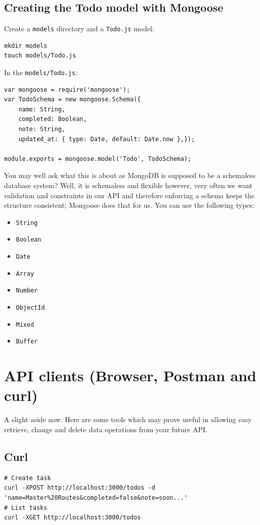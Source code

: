 \documentclass[12pt]{article}
\begin{document}
\subsection{Creating the Todo model with Mongoose}

Create a \texttt{models} directory and a \texttt{Todo.js} model:
\begin{Verbatim}
mkdir models
touch models/Todo.js
\end{Verbatim}
In the \texttt{models/Todo.js}:
\begin{Verbatim}
var mongoose = require('mongoose');
var TodoSchema = new mongoose.Schema({  
	name: String,  
	completed: Boolean,  
	note: String,  
	updated_at: { type: Date, default: Date.now },});

module.exports = mongoose.model('Todo', TodoSchema);
\end{Verbatim}
You may well ask what this is about as MongoDB is supposed to be a schemaless database system?
Well, it is schemaless and flexible however, very often we want
validation and constraints in our API and therefore enforcing a
schema keeps the structure consistent; Mongoose does that for us.
You can use the following types:
\begin{itemize}
\item
  \verb!String!
\item
  \verb!Boolean!
\item
  \verb!Date!
\item
  \verb!Array!
\item
  \verb!Number!
\item
  \verb!ObjectId!
\item
  \verb!Mixed!
\item
  \verb!Buffer!
\end{itemize}

\section{API clients (Browser, Postman and curl)}

A slight aside now. Here are some tools which may prove useful in allowing easy
retrieve, change and delete data operations from your future API.

\subsection{Curl}

\begin{Verbatim}
# Create task
curl -XPOST http://localhost:3000/todos -d 'name=Master%20Routes&completed=false&note=soon...'
# List tasks
curl -XGET http://localhost:3000/todos
\end{Verbatim}
\end{document}
